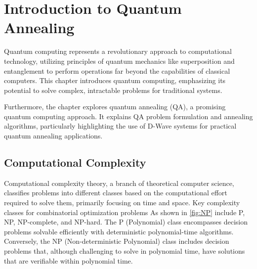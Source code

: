 \chapter{Introduction to Quantum Annealing} \label{chapter: QA}

\ifpdf
    \graphicspath{{Chapter3/Figs/Raster/}{Chapter3/Figs/PDF/}{Chapter3/Figs/}}
\else
    \graphicspath{{Chapter3/Figs/Vector/}{Chapter3/Figs/}}
\fi
Quantum computing represents a revolutionary approach to computational technology, utilizing principles of quantum mechanics like superposition and entanglement to perform operations far beyond the capabilities of classical computers. This chapter introduces quantum computing, emphasizing its potential to solve complex, intractable problems for traditional systems.

Furthermore, the chapter explores quantum annealing (QA), a promising quantum computing approach. It explains QA problem formulation and annealing algorithms, particularly highlighting the use of D-Wave systems for practical quantum annealing applications. %
\section{Computational Complexity}

Computational complexity theory, a branch of theoretical computer science, classifies problems into different classes based on the computational effort required to solve them, primarily focusing on time and space. Key complexity classes for combinatorial optimization problems As shown in \autoref{fig:NP} include P, NP, NP-complete, and NP-hard. The P (Polynomial) class encompasses decision problems solvable efficiently with deterministic polynomial-time algorithms. Conversely, the NP (Non-deterministic Polynomial) class includes decision problems that, although challenging to solve in polynomial time, have solutions that are verifiable within polynomial time.

